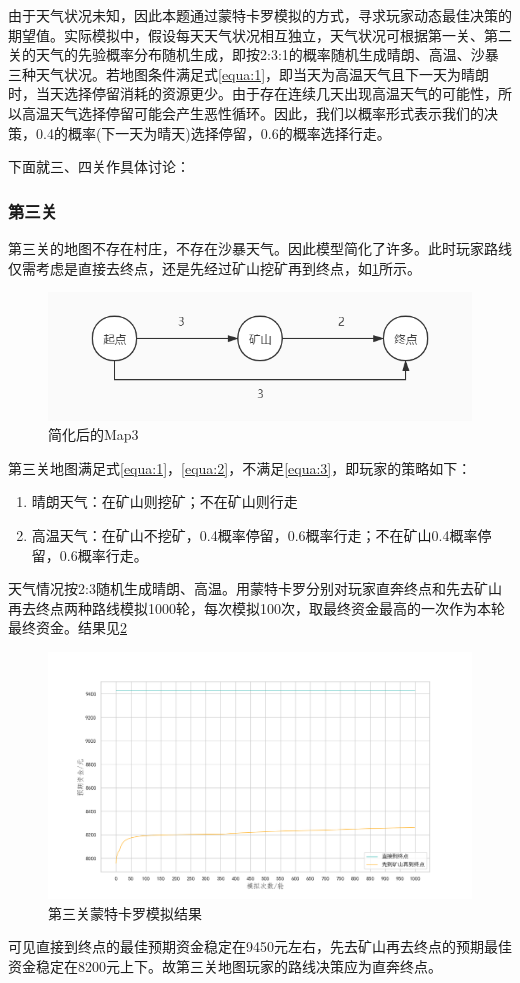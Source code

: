 \documentclass[withoutpreface,bwprint]{cumcmthesis} %
\begin{document}
由于天气状况未知，因此本题通过蒙特卡罗模拟的方式，寻求玩家动态最佳决策的期望值。实际模拟中，假设每天天气状况相互独立，天气状况可根据第一关、第二关的天气的先验概率分布随机生成，即按2:3:1的概率随机生成晴朗、高温、沙暴三种天气状况。若地图条件满足式\cref{equa:1}，即当天为高温天气且下一天为晴朗时，当天选择停留消耗的资源更少。由于存在连续几天出现高温天气的可能性，所以高温天气选择停留可能会产生恶性循环。因此，我们以概率形式表示我们的决策，0.4的概率(下一天为晴天)选择停留，0.6的概率选择行走。

下面就三、四关作具体讨论：
\subsubsection{第三关}
第三关的地图不存在村庄，不存在沙暴天气。因此模型简化了许多。此时玩家路线仅需考虑是直接去终点，还是先经过矿山挖矿再到终点，如\cref{fig:map3}所示。
\begin{figure}[H]
	\centering
	\includegraphics[scale=0.5]{figures/map3.jpg}
	\caption{简化后的Map3}
	\label{fig:map3}
\end{figure}

第三关地图满足式\cref{equa:1}，\cref{equa:2}，不满足\cref{equa:3}，即玩家的策略如下：
\begin{enumerate}
    \item 晴朗天气：在矿山则挖矿；不在矿山则行走
    \item 高温天气：在矿山不挖矿，0.4概率停留，0.6概率行走；不在矿山0.4概率停留，0.6概率行走。
\end{enumerate}

天气情况按2:3随机生成晴朗、高温。用蒙特卡罗分别对玩家直奔终点和先去矿山再去终点两种路线模拟1000轮，每次模拟100次，取最终资金最高的一次作为本轮最终资金。结果见\cref{fig:check3}
\begin{figure}[H]
    \centering
    \includegraphics[scale=0.5]{figures/check3.png}
    \caption{第三关蒙特卡罗模拟结果}
    \label{fig:check3}
\end{figure}
可见直接到终点的最佳预期资金稳定在9450元左右，先去矿山再去终点的预期最佳资金稳定在8200元上下。故第三关地图玩家的路线决策应为直奔终点。
\end{document}
